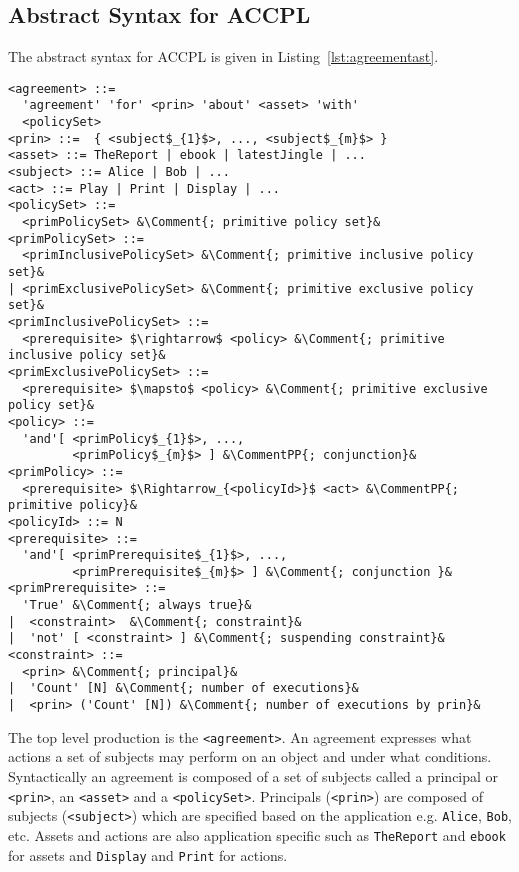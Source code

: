 \documentclass[runningheads,a4paper]{llncs}
\newcommand{\syn}{\texttt}
\begin{document}
\subsection{Abstract Syntax for ACCPL} \label{sec:productionast}

The abstract syntax for \ac{ACCPL} is given in Listing~\ref{lst:agreementast}. 
\newcommand*{\Comment}[1]{\hfill\makebox[5.0cm][l]{#1}}%
\newcommand*{\CommentPP}[1]{\hfill\makebox[3.0cm][l]{#1}}%
\lstset{mathescape, language=AST, escapechar=\&} 
\begin{lstlisting}[frame=single, caption={Abstract Syntax for ACCPL},label={lst:agreementast}]
<agreement> ::= 
  'agreement' 'for' <prin> 'about' <asset> 'with'
  <policySet> 
<prin> ::=  { <subject$_{1}$>, ..., <subject$_{m}$> }
<asset> ::= TheReport | ebook | latestJingle | ...
<subject> ::= Alice | Bob | ...
<act> ::= Play | Print | Display | ...
<policySet> ::=  
  <primPolicySet> &\Comment{; primitive policy set}&
<primPolicySet> ::=  
  <primInclusivePolicySet> &\Comment{; primitive inclusive policy set}&
| <primExclusivePolicySet> &\Comment{; primitive exclusive policy set}&
<primInclusivePolicySet> ::=  
  <prerequisite> $\rightarrow$ <policy> &\Comment{; primitive inclusive policy set}&
<primExclusivePolicySet> ::=  
  <prerequisite> $\mapsto$ <policy> &\Comment{; primitive exclusive policy set}&
<policy> ::=  
  'and'[ <primPolicy$_{1}$>, ..., 
         <primPolicy$_{m}$> ] &\CommentPP{; conjunction}&
<primPolicy> ::=  
  <prerequisite> $\Rightarrow_{<policyId>}$ <act> &\CommentPP{; primitive policy}&
<policyId> ::= N 
<prerequisite> ::=    
  'and'[ <primPrerequisite$_{1}$>, ..., 
         <primPrerequisite$_{m}$> ] &\Comment{; conjunction }&
<primPrerequisite> ::=  
  'True' &\Comment{; always true}&
|  <constraint>	 &\Comment{; constraint}&
|  'not' [ <constraint> ] &\Comment{; suspending constraint}&    
<constraint> ::=  
  <prin> &\Comment{; principal}&
|  'Count' [N] &\Comment{; number of executions}&
|  <prin> ('Count' [N]) &\Comment{; number of executions by prin}&     
\end{lstlisting}
The top level production is the \syn{<agreement>}. An agreement expresses what actions a set of subjects may perform on an object and under what conditions. Syntactically an agreement is composed of a set of subjects called a principal or \syn{<prin>}, an \syn{<asset>} and a \syn{<policySet>}. Principals (\syn{<prin>}) are composed of subjects (\syn{<subject>}) which are specified based on the application e.g. \syn{Alice}, \syn{Bob}, etc. Assets and actions are also application specific such as \syn{TheReport} and \syn{ebook} for assets and \syn{Display} and \syn{Print} for actions. 
\end{document}
